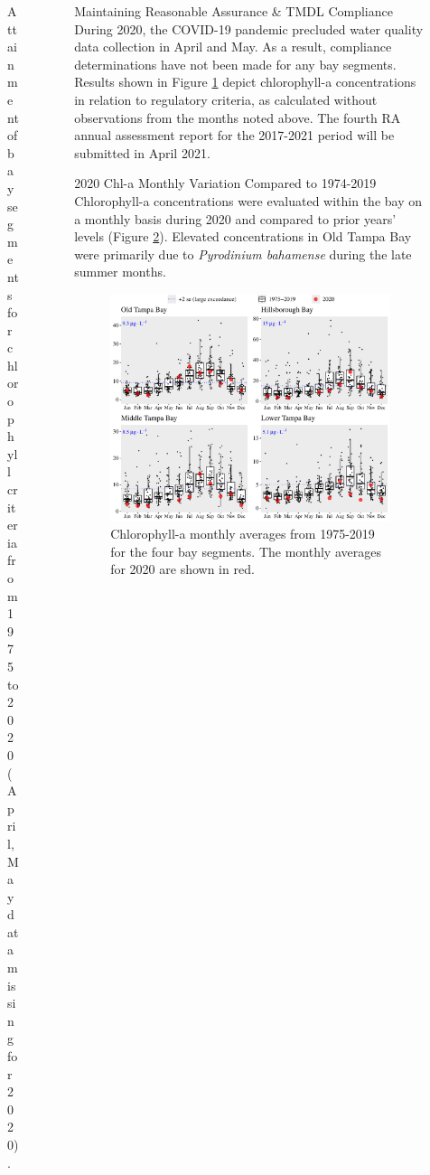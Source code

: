 \documentclass[final,t]{beamer}\usepackage[]{graphicx}\usepackage[]{color}
\begin{document}
\begin{frame}
\begin{columns}[t]
\begin{column}{.2\linewidth}
\begin{figure}
\caption{\footnotesize Attainment of bay segments for chlorophyll criteria from 1975 to 2020 (April, May data missing for 2020).}
\label{fig:chlmat}
\end{figure}

\end{column}

\begin{column}{.79\linewidth}

\begin{block}{Maintaining Reasonable Assurance \& TMDL Compliance}
\footnotesize During 2020, the COVID-19 pandemic precluded water quality data collection in April and May. As a result, compliance determinations have not been made for any bay segments. Results shown in Figure \ref{fig:chlmat} depict chlorophyll-a concentrations in relation to regulatory criteria, as calculated without observations from the months noted above. The fourth RA annual assessment report for the 2017-2021 period will be submitted in April 2021.
\end{block}

\begin{block}{2020 Chl-a Monthly Variation Compared to 1974-2019}
\footnotesize
Chlorophyll-a concentrations were evaluated within the bay on a monthly basis during 2020 and compared to prior years' levels (Figure \ref{fig:chlboxplot}). Elevated concentrations in Old Tampa Bay were primarily due to \textit{Pyrodinium bahamense} during the late summer months.
\end{block}



\vspace{-0.2in}

\begin{figure}
\centerline{\includegraphics[trim = 0cm 0cm 0cm 0cm, width=1\linewidth]{figure/chlboxplot.pdf}}
\caption{\footnotesize Chlorophyll-a monthly averages from 1975-2019 for the four bay segments. The monthly averages for 2020 are shown in red.}
\label{fig:chlboxplot}
\end{figure}


\end{column}
\end{columns}
\end{frame}
\end{document}
